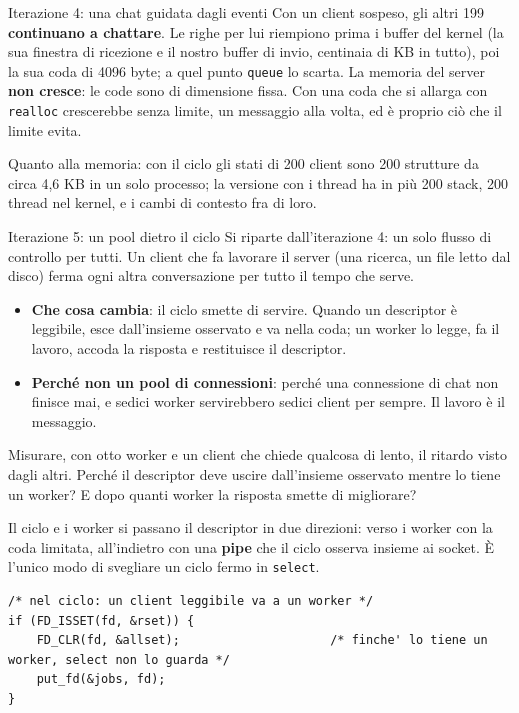 \begin{esercizio}{Iterazione 4: una chat guidata dagli eventi}
Con un client sospeso, gli altri 199 \textbf{continuano a chattare}. Le righe per lui riempiono prima i buffer del kernel
(la sua finestra di ricezione e il nostro buffer di invio, centinaia di KB in tutto), poi la sua coda di 4096 byte; a quel
punto \texttt{queue} lo scarta. La memoria del server \textbf{non cresce}: le code sono di dimensione fissa. Con una coda
che si allarga con \texttt{realloc} crescerebbe senza limite, un messaggio alla volta, ed è proprio ciò che il limite
evita.

Quanto alla memoria: con il ciclo gli stati di 200 client sono 200 strutture da circa 4,6 KB in un solo processo; la
versione con i thread ha in più 200 stack, 200 thread nel kernel, e i cambi di contesto fra di loro.
\end{esercizio}

\begin{esercizio}{Iterazione 5: un pool dietro il ciclo}
Si riparte dall'iterazione 4: un solo flusso di controllo per tutti. Un client che fa lavorare il server (una ricerca, un
file letto dal disco) ferma ogni altra conversazione per tutto il tempo che serve.
\begin{itemize}
    \item \textbf{Che cosa cambia}: il ciclo smette di servire. Quando un descriptor è leggibile, esce dall'insieme
          osservato e va nella coda; un worker lo legge, fa il lavoro, accoda la risposta e restituisce il descriptor.
    \item \textbf{Perché non un pool di connessioni}: perché una connessione di chat non finisce mai, e sedici worker
          servirebbero sedici client per sempre. Il lavoro è il messaggio.
\end{itemize}
Misurare, con otto worker e un client che chiede qualcosa di lento, il ritardo visto dagli altri. Perché il descriptor deve
uscire dall'insieme osservato mentre lo tiene un worker? E dopo quanti worker la risposta smette di migliorare?

\svolgimento
Il ciclo e i worker si passano il descriptor in due direzioni: verso i worker con la coda limitata, all'indietro con una
\textbf{pipe} che il ciclo osserva insieme ai socket. È l'unico modo di svegliare un ciclo fermo in \texttt{select}.

\begin{lstlisting}[language={[POSIX]C}, style=wnumbers, title={chatd.c: andata e ritorno di un descriptor}]
/* nel ciclo: un client leggibile va a un worker */
if (FD_ISSET(fd, &rset)) {
    FD_CLR(fd, &allset);                     /* finche' lo tiene un worker, select non lo guarda */
    put_fd(&jobs, fd);
}


\end{lstlisting}
\end{esercizio}
